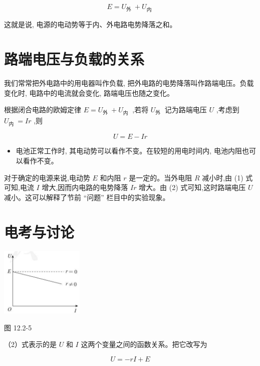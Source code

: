 \documentclass[10pt]{article}
\begin{document}
\[
E = {U}_{\text{外 }} + {U}_{\text{内 }}
\]

这就是说, 电源的电动势等于内、外电路电势降落之和。

\section*{路端电压与负载的关系}

我们常常把外电路中的用电器叫作负载, 把外电路的电势降落叫作路端电压。负载变化时, 电路中的电流就会变化, 路端电压也随之变化。

根据闭合电路的欧姆定律 \(E = {U}_{\text{外 }} + {U}_{\text{内 }}\) ,若将 \({U}_{\text{外 }}\) 记为路端电压 \(U\) ,考虑到 \({U}_{\text{内 }} = {Ir}\) ,则

\[
U = E - {Ir} \tag{（2）}
\]

\begin{mdframed}

\begin{itemize}
\item 电池正常工作时, 其电动势可以看作不变。在较短的用电时间内, 电池内阻也可以看作不变。
\end{itemize}

\end{mdframed}

对于确定的电源来说,电动势 \(E\) 和内阻 \(r\) 是一定的。当外电阻 \(R\) 减小时,由 (1) 式可知,电流 \(I\) 增大,因而内电路的电势降落 \({Ir}\) 增大。由 (2) 式可知,这时路端电压 \(U\) 减小。这可以解释了节前 “问题” 栏目中的实验现象。

\section*{电考与讨论}

\begin{center}
\includegraphics[max width=0.3\textwidth]{images/01911d5f-8e38-70c0-b5b8-2b399bd115b6_91_176991.jpg}
\end{center}

图 12.2-5

（2）式表示的是 \(U\) 和 \(I\) 这两个变量之间的函数关系。把它改写为

\[
U = - {rI} + E
\]
\end{document}
